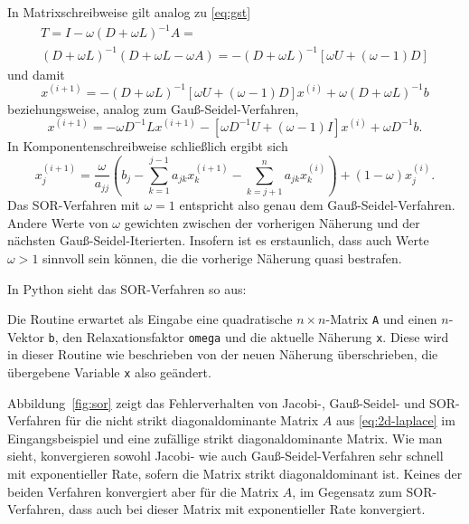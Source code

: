 In Matrixschreibweise gilt analog zu \eqref{eq:gst}
\begin{multline}
  T = I - \omega(D + \omega L)^{-1} A =\\
  (D + \omega L)^{-1}(D + \omega L - \omega A) = -(D+\omega L)^{-1}
  \left[\omega U + (\omega-1) D\right]
\end{multline}
und damit
\begin{equation}
  x^{(i+1)} = -(D+\omega L)^{-1}
  \left[\omega U + (\omega-1) D\right]x^{(i)} +
  \omega(D + \omega L)^{-1} b
\end{equation}
beziehungsweise, analog zum Gauß-Seidel-Verfahren,
\begin{equation}
  x^{(i+1)} = -\omega D^{-1}L x^{(i+1)}
  -\left[\omega D^{-1}U + (\omega-1)I\right]x^{(i)} +
  \omega D^{-1}b.
\end{equation}
In Komponentenschreibweise schließlich ergibt sich
\begin{equation}
  x_j^{(i+1)} = \frac{\omega}{a_{jj}}\left(
    b_j
    - \sum_{k=1}^{j-1} a_{jk} x_k^{(i+1)}
    - \sum_{k=j+1}^{n} a_{jk} x_k^{(i)}\right)
  + (1-\omega) x_j^{(i)}.
\end{equation}
Das SOR-Verfahren mit $\omega=1$ entspricht also genau dem
Gauß-Seidel-Verfahren. Andere Werte von $\omega$ gewichten zwischen
der vorherigen Näherung und der nächsten
Gauß-Seidel-Iterierten. Insofern ist es erstaunlich, dass auch Werte
$\omega>1$ sinnvoll sein können, die die vorherige Näherung quasi
bestrafen.

In Python sieht das SOR-Verfahren so aus:

Die Routine erwartet als Eingabe eine quadratische $n\times n$-Matrix
\lstinline!A! und einen $n$-Vektor \lstinline!b!, den
Relaxationsfaktor \lstinline!omega! und die aktuelle Näherung
\lstinline!x!. Diese wird in dieser Routine wie beschrieben von der
neuen Näherung überschrieben, die übergebene Variable \lstinline!x!
also geändert.

Abbildung~\ref{fig:sor} zeigt das Fehlerverhalten von Jacobi-,
Gauß-Seidel- und SOR-Verfahren für die nicht strikt diagonaldominante
Matrix $A$ aus \eqref{eq:2d-laplace} im Eingangsbeispiel und eine
zufällige strikt diagonaldominante Matrix. Wie man sieht, konvergieren
sowohl Jacobi- wie auch Gauß-Seidel-Verfahren sehr schnell mit
exponentieller Rate, sofern die Matrix strikt diagonaldominant ist.
Keines der beiden Verfahren konvergiert aber für die Matrix $A$, im
Gegensatz zum SOR-Verfahren, dass auch bei dieser Matrix mit
exponentieller Rate konvergiert.

